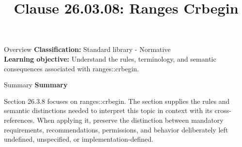 \documentclass[10pt,letterpaper]{article}
\title{Clause 26.03.08: Ranges Crbegin}
\author{}
\date{}
\begin{document}
\maketitle
\begin{CornellOverviewBox}{Overview}
\textbf{Classification:} Standard library - Normative\\[2pt]
\textbf{Learning objective:} Understand the rules, terminology, and semantic consequences associated with ranges::crbegin.
\end{CornellOverviewBox}\begin{CornellSummaryBox}{Summary}
{\sffamily\bfseries\color{Accent} Summary}\par\vspace{3pt}Section 26.3.8 focuses on ranges::crbegin. The section supplies the rules and semantic distinctions needed to interpret this topic in context with its cross-references. When applying it, preserve the distinction between mandatory requirements, recommendations, permissions, and behavior deliberately left undefined, unspecified, or implementation-defined.
\end{CornellSummaryBox}
\end{document}

